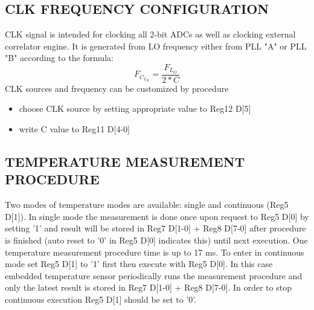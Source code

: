 \documentclass[12pt,a4paper,onecolumn]{article}
\begin{document}
\subsection{CLK FREQUENCY CONFIGURATION }
CLK signal is intended for clocking all 2-bit ADCs as well as clocking external correlator engine. It is generated from LO frequency either from PLL "A" or PLL "B" according to the formula: 
\begin{equation}
 F_C_L_K=\frac{F_L_O} {2*C} 
\end{equation}  CLK sources and frequency can be customized by procedure
\begin{itemize}
\item choose CLK source by setting appropriate value to Reg12 D[5] 
\item  write C value to Reg11 D[4-0] 
\end{itemize}

\subsection{TEMPERATURE MEASUREMENT PROCEDURE}
Two modes of temperature modes are available: single and continuous (Reg5 D[1]). In single mode the measurement is done once upon request to Reg5 D[0] by setting '1' and result will be stored in Reg7 D[1-0] + Reg8 D[7-0] after procedure is finished (auto reset to '0' in Reg5 D[0] indicates this) until next execution. One temperature measurement procedure time is up to 17 ms. To enter in continuous mode set Reg5 D[1] to '1' first then execute with Reg5 D[0]. In this case embedded temperature sensor periodically runs the measurement procedure and only the latest result is stored in Reg7 D[1-0] + Reg8 D[7-0]. In order to stop continuous execution Reg5 D[1] should be set to '0'. 
\end{document}

